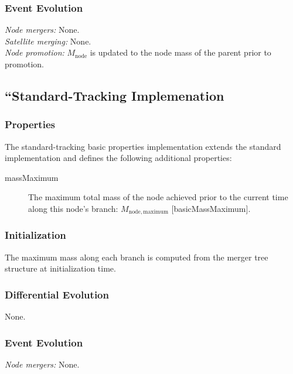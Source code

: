 \subsubsection{Event Evolution}

\noindent\emph{Node mergers:} None.\\

\noindent\emph{Satellite merging:} None.\\

\noindent\emph{Node promotion:} $M_\mathrm{node}$ is updated to the \gls{node} mass of the parent prior to promotion.\\

\subsection{``Standard-Tracking Implemenation}

\subsubsection{Properties}

The standard-tracking basic properties implementation extends the standard implementation and defines the following additional properties:
\begin{description}
 \item [{\normalfont \ttfamily massMaximum}] The maximum total mass of the node achieved prior to the current time along this node's branch: $M_\mathrm{node, maximum}$ [{\normalfont \ttfamily basicMassMaximum}].
\end{description}

\subsubsection{Initialization}

The maximum mass along each branch is computed from the merger tree structure at initialization time.

\subsubsection{Differential Evolution}

None.

\subsubsection{Event Evolution}

\noindent\emph{Node mergers:} None.\\


